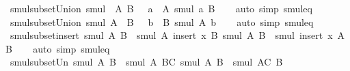 \begin{isabellebody}
\isanewline
{}\isamarkupfalse%
\ smul{\isacharunderscore}{\kern0pt}subset{\isacharunderscore}{\kern0pt}Union{}{\isacharcolon}{\kern0pt}\ {\isachardoublequoteopen}smul\ {\isacharparenleft}{\kern0pt}{\isasymUnion}\ A{\isacharparenright}{\kern0pt}\ B\ {\isacharequal}{\kern0pt}\ {\isacharparenleft}{\kern0pt}{\isasymUnion}\ a\ {\isasymin}\ A{\isachardot}{\kern0pt}\ smul\ a\ B{\isacharparenright}{\kern0pt}{\isachardoublequoteclose}\isanewline
%
\isadelimproof
\ \ %
\endisadelimproof
%
\isatagproof
{}\isamarkupfalse%
\ {\isacharparenleft}{\kern0pt}auto\ simp{\isacharcolon}{\kern0pt}\ smul{\isacharunderscore}{\kern0pt}eq{\isacharparenright}{\kern0pt}%
\endisatagproof
{\isafoldproof}%
%
\isadelimproof
\isanewline
%
\endisadelimproof
\isanewline
{}\isamarkupfalse%
\ smul{\isacharunderscore}{\kern0pt}subset{\isacharunderscore}{\kern0pt}Union{}{\isacharcolon}{\kern0pt}\ {\isachardoublequoteopen}smul\ A\ {\isacharparenleft}{\kern0pt}{\isasymUnion}\ B{\isacharparenright}{\kern0pt}\ {\isacharequal}{\kern0pt}\ {\isacharparenleft}{\kern0pt}{\isasymUnion}\ b\ {\isasymin}\ B{\isachardot}{\kern0pt}\ smul\ A\ b{\isacharparenright}{\kern0pt}{\isachardoublequoteclose}\isanewline
%
\isadelimproof
\ \ %
\endisadelimproof
%
\isatagproof
{}\isamarkupfalse%
\ {\isacharparenleft}{\kern0pt}auto\ simp{\isacharcolon}{\kern0pt}\ smul{\isacharunderscore}{\kern0pt}eq{\isacharparenright}{\kern0pt}%
\endisatagproof
{\isafoldproof}%
%
\isadelimproof
\isanewline
%
\endisadelimproof
\isanewline
{}\isamarkupfalse%
\ smul{\isacharunderscore}{\kern0pt}subset{\isacharunderscore}{\kern0pt}insert{\isacharcolon}{\kern0pt}\ {\isachardoublequoteopen}smul\ A\ B\ {\isasymsubseteq}\ smul\ A\ {\isacharparenleft}{\kern0pt}insert\ x\ B{\isacharparenright}{\kern0pt}{\isachardoublequoteclose}\ {\isachardoublequoteopen}smul\ A\ B\ {\isasymsubseteq}\ smul\ {\isacharparenleft}{\kern0pt}insert\ x\ A{\isacharparenright}{\kern0pt}\ B{\isachardoublequoteclose}\isanewline
%
\isadelimproof
\ \ %
\endisadelimproof
%
\isatagproof
{}\isamarkupfalse%
\ {\isacharparenleft}{\kern0pt}auto\ simp{\isacharcolon}{\kern0pt}\ smul{\isacharunderscore}{\kern0pt}eq{\isacharparenright}{\kern0pt}%
\endisatagproof
{\isafoldproof}%
%
\isadelimproof
\isanewline
%
\endisadelimproof
\isanewline
{}\isamarkupfalse%
\ smul{\isacharunderscore}{\kern0pt}subset{\isacharunderscore}{\kern0pt}Un{\isacharcolon}{\kern0pt}\ {\isachardoublequoteopen}smul\ A\ B\ {\isasymsubseteq}\ smul\ A\ {\isacharparenleft}{\kern0pt}B{\isasymunion}C{\isacharparenright}{\kern0pt}{\isachardoublequoteclose}\ {\isachardoublequoteopen}smul\ A\ B\ {\isasymsubseteq}\ smul\ {\isacharparenleft}{\kern0pt}A{\isasymunion}C{\isacharparenright}{\kern0pt}\ B{\isachardoublequoteclose}\isanewline

\end{isabellebody}

